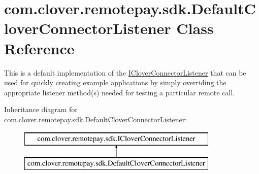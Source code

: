 \hypertarget{classcom_1_1clover_1_1remotepay_1_1sdk_1_1_default_clover_connector_listener}{}\section{com.\+clover.\+remotepay.\+sdk.\+Default\+Clover\+Connector\+Listener Class Reference}
\label{classcom_1_1clover_1_1remotepay_1_1sdk_1_1_default_clover_connector_listener}


This is a default implementation of the \hyperlink{interfacecom_1_1clover_1_1remotepay_1_1sdk_1_1_i_clover_connector_listener}{I\+Clover\+Connector\+Listener} that can be used for quickly creating example applications by simply overriding the appropriate listener method(s) needed for testing a particular remote call.  


Inheritance diagram for com.\+clover.\+remotepay.\+sdk.\+Default\+Clover\+Connector\+Listener\+:\begin{figure}[H]
\begin{center}
\leavevmode
\includegraphics[height=2.000000cm]{classcom_1_1clover_1_1remotepay_1_1sdk_1_1_default_clover_connector_listener}
\end{center}
\end{figure}
